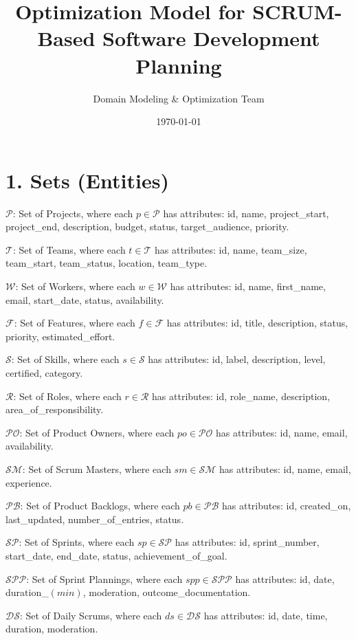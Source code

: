 \documentclass[12pt]{article}
\title{\textbf{Optimization Model for SCRUM-Based Software Development Planning}}
\author{Domain Modeling & Optimization Team}
\date{\today}
\begin{document}
\maketitle
\tableofcontents
\newpage

\section{1. Sets (Entities)}

\item $\mathcal{P}$: Set of Projects, where each $p \in \mathcal{P}$ has attributes: id, name, project\_start, project\_end, description, budget, status, target\_audience, priority.
    \item $\mathcal{T}$: Set of Teams, where each $t \in \mathcal{T}$ has attributes: id, name, team\_size, team\_start, team\_status, location, team\_type.
    \item $\mathcal{W}$: Set of Workers, where each $w \in \mathcal{W}$ has attributes: id, name, first\_name, email, start\_date, status, availability.
    \item $\mathcal{F}$: Set of Features, where each $f \in \mathcal{F}$ has attributes: id, title, description, status, priority, estimated\_effort.
    \item $\mathcal{S}$: Set of Skills, where each $s \in \mathcal{S}$ has attributes: id, label, description, level, certified, category.
    \item $\mathcal{R}$: Set of Roles, where each $r \in \mathcal{R}$ has attributes: id, role\_name, description, area\_of\_responsibility.
    \item $\mathcal{PO}$: Set of Product Owners, where each $po \in \mathcal{PO}$ has attributes: id, name, email, availability.
    \item $\mathcal{SM}$: Set of Scrum Masters, where each $sm \in \mathcal{SM}$ has attributes: id, name, email, experience.
    \item $\mathcal{PB}$: Set of Product Backlogs, where each $pb \in \mathcal{PB}$ has attributes: id, created\_on, last\_updated, number\_of\_entries, status.
    \item $\mathcal{SP}$: Set of Sprints, where each $sp \in \mathcal{SP}$ has attributes: id, sprint\_number, start\_date, end\_date, status, achievement\_of\_goal.
    \item $\mathcal{SPP}$: Set of Sprint Plannings, where each $spp \in \mathcal{SPP}$ has attributes: id, date, duration\_$(min)$, moderation, outcome\_documentation.
    \item $\mathcal{DS}$: Set of Daily Scrums, where each $ds \in \mathcal{DS}$ has attributes: id, date, time, duration, moderation.
\end{document}
